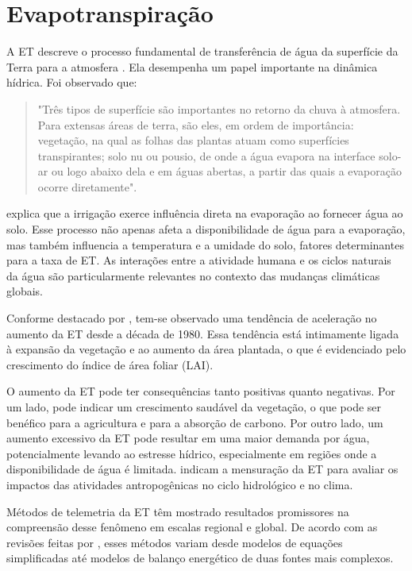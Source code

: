\section{Evapotranspiração}

A ET descreve o processo fundamental de transferência de água da superfície da Terra para a atmosfera \parencite{carmody_fao2023}. Ela desempenha um papel importante na dinâmica hídrica. Foi observado que:

\begin{quote}
  "Três tipos de superfície são importantes no retorno da chuva à atmosfera. Para extensas áreas de terra, são eles, em ordem de importância: vegetação, na qual as folhas das plantas atuam como superfícies transpirantes; solo nu ou pousio, de onde a água evapora na interface solo-ar ou logo abaixo dela e em águas abertas, a partir das quais a evaporação ocorre diretamente". \parencite[{p. 121}]{Penman_evapotranspiration1948}
\end{quote}

\textcite{Penman_evapotranspiration1948} explica que a irrigação exerce influência direta na evaporação ao fornecer água ao solo. Esse processo não apenas afeta a disponibilidade de água para a evaporação, mas também influencia a temperatura e a umidade do solo, fatores determinantes para a taxa de ET. As interações entre a atividade humana e os ciclos naturais da água são particularmente relevantes no contexto das mudanças climáticas globais. 

Conforme destacado por \textcite{yang_nature2023}, tem-se observado uma tendência de aceleração no aumento da ET desde a década de 1980. Essa tendência está intimamente ligada à expansão da vegetação e ao aumento da área plantada, o que é evidenciado pelo crescimento do índice de área foliar (LAI).

O aumento da ET pode ter consequências tanto positivas quanto negativas. Por um lado, pode indicar um crescimento saudável da vegetação, o que pode ser benéfico para a agricultura e para a absorção de carbono. Por outro lado, um aumento excessivo da ET pode resultar em uma maior demanda por água, potencialmente levando ao estresse hídrico, especialmente em regiões onde a disponibilidade de água é limitada. \textcite{yang_nature2023} indicam a mensuração da ET para avaliar os impactos das atividades antropogênicas no ciclo hidrológico e no clima.

Métodos de telemetria da ET têm mostrado resultados promissores na compreensão desse fenômeno em escalas regional e global. De acordo com as revisões feitas por \textcite{Zhao_evapotranspiration_med2009, Zhang_evapotranspiration_med2016}, esses métodos variam desde modelos de equações simplificadas até modelos de balanço energético de duas fontes mais complexos. 

